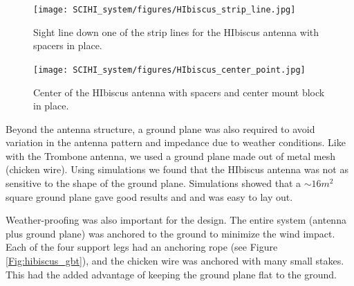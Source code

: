 \begin{figure}[htb]
\centering
\begin{minipage}[b]{0.52\textwidth}
\centering
\texttt{[image: SCIHI\_system/figures/HIbiscus\_strip\_line.jpg]}
\caption{Sight line down one of the strip lines for the HIbiscus antenna with spacers in place.}
\label{Fig:hibiscus_spacer}
\end{minipage}%
\begin{minipage}[b]{0.02\textwidth}
\hspace{1cm}
\end{minipage}%
\begin{minipage}[b]{0.42\textwidth}
\centering
\texttt{[image: SCIHI\_system/figures/HIbiscus\_center\_point.jpg]}
\caption{Center of the HIbiscus antenna with spacers and center mount block in place.}
\label{Fig:hibiscus_center}
\end{minipage}
\end{figure}

Beyond the antenna structure, a ground plane was also required to avoid variation in the antenna pattern and impedance due to weather conditions. Like with the Trombone antenna, we used a ground plane made out of metal mesh (chicken wire). Using simulations we found that the HIbiscus antenna was not as sensitive to the shape of the ground plane. Simulations showed that a $\sim16 m^2$ square ground plane gave good results and and was easy to lay out. 

Weather-proofing was also important for the design. The entire system (antenna plus ground plane) was anchored to the ground to minimize the wind impact. Each of the four support legs had an anchoring rope (see Figure \ref{Fig:hibiscus_gbt}), and the chicken wire was anchored with many small stakes. This had the added advantage of keeping the ground plane flat to the ground. 

